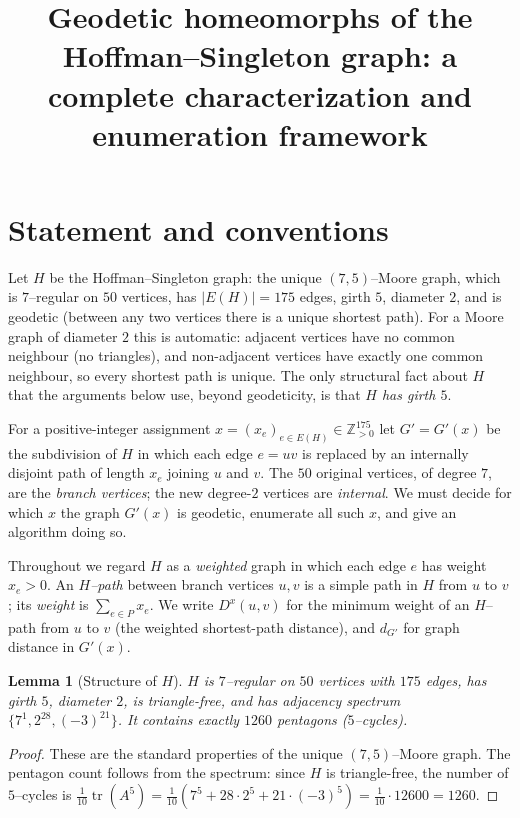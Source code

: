 \documentclass{amsart}
\newtheorem{lemma}{Lemma}
\theoremstyle{definition}
\begin{document}
\title{Geodetic homeomorphs of the Hoffman--Singleton graph:
a complete characterization and enumeration framework}
\maketitle

\section{Statement and conventions}

Let $H$ be the Hoffman--Singleton graph: the unique $(7,5)$--Moore graph, which
is $7$--regular on $50$ vertices, has $|E(H)|=175$ edges, girth $5$, diameter
$2$, and is geodetic (between any two vertices there is a unique shortest path).
For a Moore graph of diameter $2$ this is automatic: adjacent vertices have no
common neighbour (no triangles), and non-adjacent vertices have exactly one
common neighbour, so every shortest path is unique. The only structural fact
about $H$ that the arguments below use, beyond geodeticity, is that
\emph{$H$ has girth $5$}.

For a positive-integer assignment $x=(x_e)_{e\in E(H)}\in\mathbb Z_{>0}^{175}$
let $G'=G'(x)$ be the subdivision of $H$ in which each edge $e=uv$ is replaced
by an internally disjoint path of length $x_e$ joining $u$ and $v$. The $50$
original vertices, of degree $7$, are the \emph{branch vertices}; the new
degree-$2$ vertices are \emph{internal}. We must decide for which $x$ the graph
$G'(x)$ is geodetic, enumerate all such $x$, and give an algorithm doing so.

Throughout we regard $H$ as a \emph{weighted} graph in which each edge $e$ has
weight $x_e>0$. An \emph{$H$--path} between branch vertices $u,v$ is a simple
path in $H$ from $u$ to $v$; its \emph{weight} is $\sum_{e\in P}x_e$. We write
$D^x(u,v)$ for the minimum weight of an $H$--path from $u$ to $v$ (the weighted
shortest-path distance), and $d_{G'}$ for graph distance in $G'(x)$.

\begin{lemma}[Structure of $H$]\label{lem:struct}
$H$ is $7$--regular on $50$ vertices with $175$ edges, has girth $5$, diameter
$2$, is triangle-free, and has adjacency spectrum
$\{7^{1},2^{28},(-3)^{21}\}$. It contains exactly $1260$ pentagons ($5$--cycles).
\end{lemma}

\begin{proof}
These are the standard properties of the unique $(7,5)$--Moore graph. The
pentagon count follows from the spectrum: since $H$ is triangle-free, the number
of $5$--cycles is
$\tfrac{1}{10}\operatorname{tr}(A^{5})=\tfrac{1}{10}(7^{5}+28\cdot2^{5}
+21\cdot(-3)^{5})=\tfrac{1}{10}\cdot12600=1260$.
\end{proof}
\end{document}
